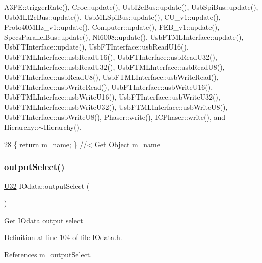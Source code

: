 A3\+P\+E\+::trigger\+Rate(), Croc\+::update(), Usb\+I2c\+Bus\+::update(), Usb\+Spi\+Bus\+::update(), Usb\+M\+L\+I2c\+Bus\+::update(), Usb\+M\+L\+Spi\+Bus\+::update(), C\+U\+\_\+v1\+::update(), Proto40\+M\+Hz\+\_\+v1\+::update(), Computer\+::update(), F\+E\+B\+\_\+v1\+::update(), Specs\+Parallel\+Bus\+::update(), N\+I6008\+::update(), Usb\+F\+T\+M\+L\+Interface\+::update(), Usb\+F\+T\+Interface\+::update(), Usb\+F\+T\+Interface\+::usb\+Read\+U16(), Usb\+F\+T\+M\+L\+Interface\+::usb\+Read\+U16(), Usb\+F\+T\+Interface\+::usb\+Read\+U32(), Usb\+F\+T\+M\+L\+Interface\+::usb\+Read\+U32(), Usb\+F\+T\+M\+L\+Interface\+::usb\+Read\+U8(), Usb\+F\+T\+Interface\+::usb\+Read\+U8(), Usb\+F\+T\+M\+L\+Interface\+::usb\+Write\+Read(), Usb\+F\+T\+Interface\+::usb\+Write\+Read(), Usb\+F\+T\+Interface\+::usb\+Write\+U16(), Usb\+F\+T\+M\+L\+Interface\+::usb\+Write\+U16(), Usb\+F\+T\+Interface\+::usb\+Write\+U32(), Usb\+F\+T\+M\+L\+Interface\+::usb\+Write\+U32(), Usb\+F\+T\+M\+L\+Interface\+::usb\+Write\+U8(), Usb\+F\+T\+Interface\+::usb\+Write\+U8(), Phaser\+::write(), I\+C\+Phaser\+::write(), and Hierarchy\+::$\sim$\+Hierarchy().


\begin{DoxyCode}
28 \{ \textcolor{keywordflow}{return} \hyperlink{classObject_a8b83c95c705d2c3ba0d081fe1710f48d}{m\_name}; \} \textcolor{comment}{//< Get Object m\_name}
\end{DoxyCode}
\mbox{\label{classIOdata_aaa410b57a4607857d45ac6a7cd013307}} 
\subsubsection{\texorpdfstring{output\+Select()}{outputSelect()}}
{\footnotesize\ttfamily \hyperlink{classIOdata_a96fb57f5fcd87b708743abd3c86a5198}{U32} I\+Odata\+::output\+Select (\begin{DoxyParamCaption}{ }\end{DoxyParamCaption})\hspace{0.3cm}{\ttfamily [inline]}}

Get \hyperlink{classIOdata}{I\+Odata} output select 

Definition at line 104 of file I\+Odata.\+h.



References m\+\_\+output\+Select.



